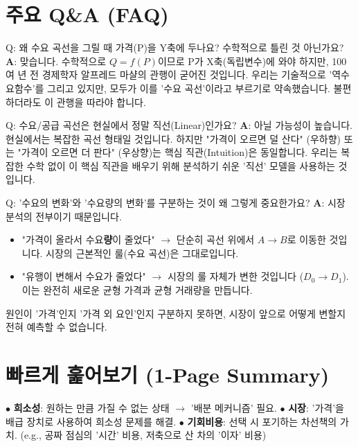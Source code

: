 \documentclass[11pt,a4paper]{article}
\theoremstyle{definition}
\begin{document}
\section{주요 Q\&A (FAQ)}

\begin{keypointbox}{Q: 왜 수요 곡선을 그릴 때 가격(P)을 Y축에 두나요? 수학적으로 틀린 것 아닌가요?}
    \textbf{A}: 맞습니다. 수학적으로 $Q=f(P)$이므로 P가 X축(독립변수)에 와야 하지만, 100여 년 전 경제학자 알프레드 마샬의 관행이 굳어진 것입니다. 우리는 기술적으로 '역수요함수'를 그리고 있지만, 모두가 이를 '수요 곡선'이라고 부르기로 약속했습니다. 불편하더라도 이 관행을 따라야 합니다.
\end{keypointbox}

\begin{keypointbox}{Q: 수요/공급 곡선은 현실에서 정말 직선(Linear)인가요?}
    \textbf{A}: 아닐 가능성이 높습니다. 현실에서는 복잡한 곡선 형태일 것입니다. 하지만 "가격이 오르면 덜 산다" (우하향) 또는 "가격이 오르면 더 판다" (우상향)는 핵심 직관(Intuition)은 동일합니다. 우리는 복잡한 수학 없이 이 핵심 직관을 배우기 위해 분석하기 쉬운 '직선' 모델을 사용하는 것입니다.
\end{keypointbox}

\begin{keypointbox}{Q: '수요의 변화'와 '수요량의 변화'를 구분하는 것이 왜 그렇게 중요한가요?}
    \textbf{A}: 시장 분석의 전부이기 때문입니다.
    \begin{itemize}
        \item "가격이 올라서 수요\textbf{량}이 줄었다" $\rightarrow$ 단순히 곡선 위에서 $A \rightarrow B$로 이동한 것입니다. 시장의 근본적인 룰(수요 곡선)은 그대로입니다.
        \item "유행이 변해서 수요가 줄었다" $\rightarrow$ 시장의 룰 자체가 변한 것입니다 ($D_0 \rightarrow D_1$). 이는 완전히 새로운 균형 가격과 균형 거래량을 만듭니다.
    \end{itemize}
    원인이 '가격'인지 '가격 외 요인'인지 구분하지 못하면, 시장이 앞으로 어떻게 변할지 전혀 예측할 수 없습니다.
\end{keypointbox}

\newpage

\section{빠르게 훑어보기 (1-Page Summary)}

\begin{tcolorbox}[title=\textbf{1. 희소성 (Scarcity) \& 기회비용 (Opportunity Cost)}]
    $\bullet$ \textbf{희소성}: 원하는 만큼 가질 수 없는 상태 $\rightarrow$ '배분 메커니즘' 필요.
    \newline
    $\bullet$ \textbf{시장}: '가격'을 배급 장치로 사용하여 희소성 문제를 해결.
    \newline
    $\bullet$ \textbf{기회비용}: 선택 시 포기하는 차선책의 가치. (e.g., 공짜 점심의 '시간' 비용, 저축으로 산 차의 '이자' 비용)
\end{tcolorbox}
\end{document}
